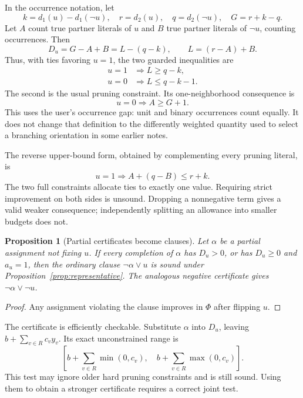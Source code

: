 \documentclass[11pt,a4paper]{article}
\newtheorem{proposition}[theorem]{Proposition}
\theoremstyle{remark}
\begin{document}
In the occurrence notation, let
\[
 k=d_1(u)-d_1(\neg u),\quad r=d_2(u),\quad q=d_2(\neg u),
 \quad G=r+k-q.
\]
Let $A$ count true partner literals of $u$ and $B$ true partner literals
of $\neg u$, counting occurrences. Then
\begin{equation}
 D_u=G-A+B=L-(q-k),\qquad L=(r-A)+B.             \label{eq:gap}
\end{equation}
Thus, with ties favoring $u=1$, the two guarded inequalities are
\begin{align}
 u=1&\Rightarrow L\ge q-k,\nonumber\\
 u=0&\Rightarrow L\le q-k-1.                    \label{eq:two}
\end{align}
The second is the usual pruning constraint. Its one-neighborhood
consequence is
\begin{equation}
 u=0\Rightarrow A\ge G+1.                      \label{eq:one}
\end{equation}
This uses the user's occurrence gap: unit and binary occurrences count
equally. It does not change that definition to the differently weighted
quantity used to select a branching orientation in some earlier notes.

The reverse upper-bound form, obtained by complementing every pruning
literal, is
\[
 u=1\Rightarrow A+(q-B)\le r+k.
\]
The two full constraints allocate ties to exactly one value. Requiring
strict improvement on both sides is unsound. Dropping a nonnegative
term gives a valid weaker consequence; independently splitting an
allowance into smaller budgets does not.

\begin{proposition}[Partial certificates become clauses]\label{prop:certificate}
Let $\alpha$ be a partial assignment not fixing $u$. If every completion
of $\alpha$ has $D_u>0$, or has $D_u\ge0$ and $a_u=1$, then the ordinary
clause $\neg\alpha\lor u$ is sound under Proposition~\ref{prop:representative}.
The analogous negative certificate gives $\neg\alpha\lor\neg u$.
\end{proposition}
\begin{proof}
Any assignment violating the clause improves in $\Phi$ after flipping $u$.
\end{proof}

The certificate is efficiently checkable. Substitute $\alpha$ into $D_u$,
leaving $b+\sum_{v\in R}c_vy_v$. Its exact unconstrained range is
\begin{equation}
 \left[b+\sum_{v\in R}\min(0,c_v),\quad
       b+\sum_{v\in R}\max(0,c_v)\right].        \label{eq:range}
\end{equation}
This test may ignore older hard pruning constraints and is still sound.
Using them to obtain a stronger certificate requires a correct joint test.
\end{document}
